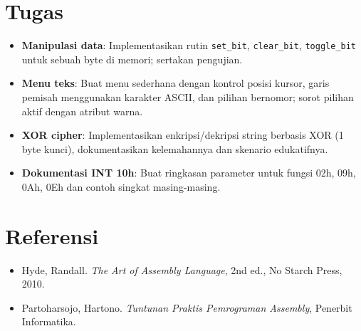 \section{Tugas}
\begin{itemize}
  \item \textbf{Manipulasi data}: Implementasikan rutin \texttt{set\_bit}, \texttt{clear\_bit}, \texttt{toggle\_bit} untuk sebuah byte di memori; sertakan pengujian.
  \item \textbf{Menu teks}: Buat menu sederhana dengan kontrol posisi kursor, garis pemisah menggunakan karakter ASCII, dan pilihan bernomor; sorot pilihan aktif dengan atribut warna.
  \item \textbf{XOR cipher}: Implementasikan enkripsi/dekripsi string berbasis XOR (1 byte kunci), dokumentasikan kelemahannya dan skenario edukatifnya.
  \item \textbf{Dokumentasi INT 10h}: Buat ringkasan parameter untuk fungsi 02h, 09h, 0Ah, 0Eh dan contoh singkat masing-masing.
\end{itemize}

\section{Referensi}
\begin{itemize}
  \item Hyde, Randall. \textit{The Art of Assembly Language}, 2nd ed., No Starch Press, 2010.
  \item Partoharsojo, Hartono. \textit{Tuntunan Praktis Pemrograman Assembly}, Penerbit Informatika.
\end{itemize}
